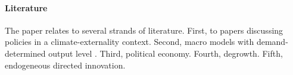 \paragraph{Literature}
The paper relates to several strands of literature. First, to papers discussing policies in a climate-externality context. 
Second, macro models with demand-determined output level \citep{Auerbach2021InequalityEconomy}\cite{Michaillat2015AggregateUnemployment}.
Third, political economy. 
Fourth, degrowth. 
Fifth, endogeneous directed innovation. 